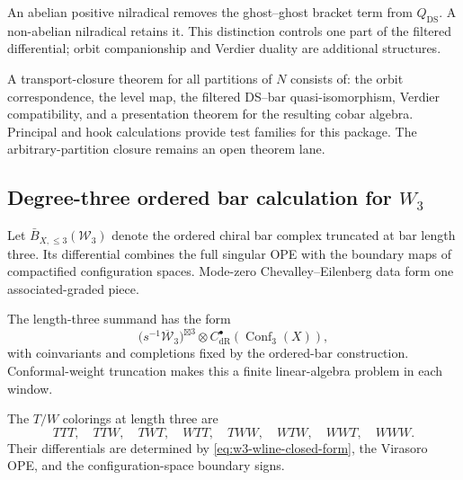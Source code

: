 \begin{remark}
\label{rem:abelian-nonabelian-nilradical}
An abelian positive nilradical removes the ghost--ghost bracket term
from \(Q_{\mathrm{DS}}\).  A non-abelian nilradical retains it.
This distinction controls one part of the filtered differential;
orbit companionship and Verdier duality are additional structures.
\end{remark}

\begin{theorem}
\label{thm:transport-closure-type-a}
\ClaimStatusOpen
A transport-closure theorem for all partitions of \(N\) consists of:
the orbit correspondence, the level map, the filtered DS--bar
quasi-isomorphism, Verdier compatibility, and a presentation theorem
for the resulting cobar algebra.  Principal and hook calculations
provide test families for this package.  The arbitrary-partition
closure remains an open theorem lane.
\end{theorem}

\subsection{Degree-three ordered bar calculation for \(W_3\)}
\label{sec:w3-bar-degree3}

Let \(\bar B_{X,\le3}(\mathcal W_3)\) denote the ordered chiral bar
complex truncated at bar length three.  Its differential combines
the full singular OPE with the boundary maps of compactified
configuration spaces.  Mode-zero Chevalley--Eilenberg data form one
associated-graded piece.

\begin{computation}
\label{comp:w3-deg3-structure}
\ClaimStatusComputed
The length-three summand has the form
\[
\bigl(s^{-1}\overline{\mathcal W}_3\bigr)^{\boxtimes3}
\otimes
C^\bullet_{\mathrm{dR}}\!\left(\operatorname{Conf}_3(X)\right),
\]
with coinvariants and completions fixed by the ordered-bar
construction.  Conformal-weight truncation makes this a finite
linear-algebra problem in each window.
\end{computation}

\begin{computation}
\label{comp:w3-deg3-mixed}
\ClaimStatusComputed
The \(T/W\) colorings at length three are
\[
TTT,\quad TTW,\quad TWT,\quad WTT,\quad
TWW,\quad WTW,\quad WWT,\quad WWW.
\]
Their differentials are determined by
\eqref{eq:w3-wline-closed-form}, the Virasoro OPE, and the
configuration-space boundary signs.
\end{computation}

